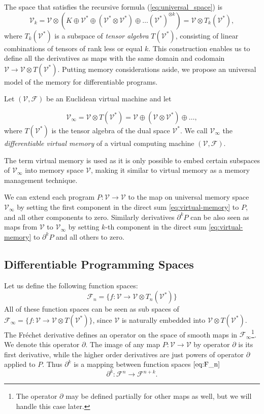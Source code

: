\documentclass[11pt]{article}
\newcommand{\VV}{\mathcal{V}}
\newcommand{\F}{\mathcal{F}}
\newcommand{\D}{\partial}
\begin{document}
  The space that satisfies the recursive formula (\ref{eq:universal_space}) is
  \begin{equation}
    \label{eq:k-th-virtual-space}
    \VV_k = \VV\otimes \left(K\oplus \VV^* \oplus (\VV^*\otimes \VV^*)\oplus\ldots
      (\VV^*)^{\otimes k}\right) = \VV\otimes T_k(\VV^*),
  \end{equation}
  where $T_k(\VV^*)$ is a subspace of \emph{tensor algebra} $T(\VV^*)$, consisting of
  linear combinations of tensors of rank less or equal $k$. This construction
  enables us to define all the derivatives as maps with 
  the same domain and codomain $\VV\to \VV\otimes T(\VV^*)$.
  Putting memory considerations aside, we propose an universal model of the
  memory for differentiable programs.
\begin{definition}\label{def:VV}
Let $(\VV,\F)$ be an Euclidean virtual machine and let  

\begin{equation}
\VV_\infty = \VV\otimes T(\VV^*) = \VV\oplus
(\VV\otimes\VV^*)\oplus\ldots,\label{eq:virtual-memory}
\end{equation}
where $T(\VV^*)$ is the tensor algebra of the dual space $\VV^*$.
We call $\VV_\infty$ the \emph{differentiable virtual memory} of a virtual
computing machine $(\VV,\F)$.
\end{definition}
The term virtual memory is used as it is only possible to embed certain subspaces of $\VV_\infty$ into memory space $\VV$, making it similar to
virtual memory as a memory management technique.  

We can extend each program $P:\VV\to \VV$ to the map on
universal memory space $\VV_\infty$ by setting the first component in the direct sum
\eqref{eq:virtual-memory} to $P$, and all other components to zero. Similarly
derivatives $\D^k P$ can be also seen as maps  from $\VV$ to $\VV_\infty$ by
setting $k$-th component in the direct sum \eqref{eq:virtual-memory} to $\D^k P$
and all others to zero. 
\subsection{Differentiable Programming Spaces}

Let us define the following function spaces:
 \begin{equation}\label{eq:F_n}
 	\F_n=\{f:\VV\to \VV\otimes T_n(\VV^*)\}
 \end{equation}
All of these function spaces can be seen as sub spaces of $\F_\infty=\{f:\VV\to \VV\otimes
T(\VV^*)\}$, since $\VV$ is naturally embedded into $ \VV\otimes T(\VV^*)$. The
Fréchet derivative defines an operator on the space of smooth maps in $\F_\infty$\footnote{The operator $\D$ may be defined partially for other maps as
   well, but we will handle this case later.}. We denote this operator $\D$. The image of any map
 $P:\VV\to \VV$ by operator $\D$ is its first derivative, while the higher order
 derivatives are just powers of operator $\D$ applied to $P$.
 Thus $\D^k$ is a mapping between function spaces $\eqref{eq:F_n}$
 \begin{equation}\label{eq:toFn+k}
 \D^k:\F^n\to\F^{n+k}.
 \end{equation}
 
\end{document}
